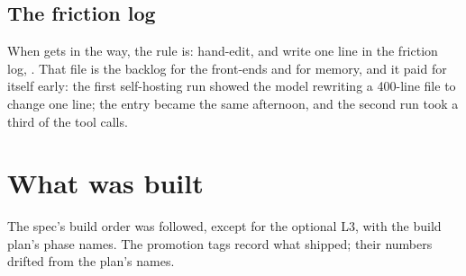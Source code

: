 \section{The friction log}

When  gets in the way, the rule is: hand-edit, and write
one line in the friction log, . That file is the backlog for the
front-ends and for memory, and it paid for itself early: the first
self-hosting run showed the model rewriting a 400-line file to change one
line; the entry became  the same afternoon, and the second run
took a third of the tool calls.

\chapter{What was built}

The spec's build order was followed, except for the optional L3, with the
build plan's phase names. The promotion tags record what shipped; their
numbers drifted from the plan's names.


